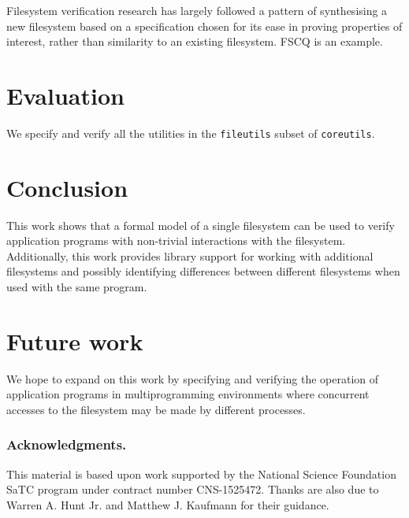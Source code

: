 \documentclass[runningheads,a4paper]{llncs}
\begin{document}
Filesystem verification research has largely followed a pattern of
synthesising a new filesystem based on a specification chosen for its
ease in proving properties of interest, rather than similarity to an
existing filesystem. FSCQ \cite{DBLP:conf/usenix/ChenZCCKZ16} is an
example.

\section{Evaluation}

We specify and verify all the utilities in the \texttt{fileutils}
subset of \texttt{coreutils}.

\section{Conclusion}

This work shows that a formal model of a single filesystem can be used
to verify application programs with non-trivial interactions with the
filesystem. Additionally, this work provides library support for
working with additional filesystems and possibly identifying
differences between different filesystems when used with the same
program.

\section{Future work}

We hope to expand on this work by specifying and verifying the
operation of application programs in multiprogramming environments
where concurrent accesses to the filesystem may be made by different
processes.

\subsubsection*{Acknowledgments.} This material is based upon work
supported by the National Science Foundation SaTC program under
contract number CNS-1525472. Thanks are also due to Warren A. Hunt
Jr. and Matthew J. Kaufmann for their guidance.



\end{document}
